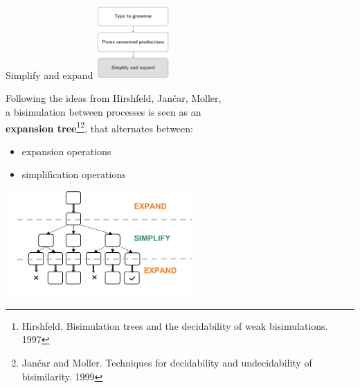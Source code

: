 \documentclass[10pt]{beamer}
\begin{document}
\begin{frame} {Simplify and expand}
	\hfill\includegraphics[height=2.8cm]{img/simplifyExpand.png}
	
	\vspace*{-3cm}
	Following the ideas from Hirshfeld, Jan{\v{c}}ar, Moller, \\
	a bisimulation between processes is seen as an \\
	{\bf expansion tree}\footnote{Hirshfeld. Bisimulation trees and the decidability of weak bisimulations. 1997}\footnote{Jan{\v{c}}ar and Moller. Techniques for decidability and undecidability of bisimilarity. 1999}, that alternates between:
	\begin{itemize}
		\item { expansion operations}
		\item { simplification operations	}
	\end{itemize}
	\begin{center}
		\hspace*{-2mm}\includegraphics[height=4cm]{img/expand_simplify}
	\end{center}	
\end{frame}
\end{document}
